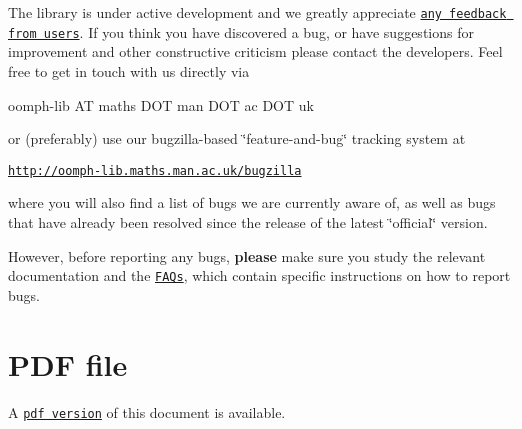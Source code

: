 The library is under active development and we greatly appreciate \href{../../contact/html/index.html}{\tt any feedback from users}. If you think you have discovered a bug, or have suggestions for improvement and other constructive criticism please contact the developers. Feel free to get in touch with us directly via

\begin{center} {\ttfamily  oomph-\/lib AT maths D\+OT man D\+OT ac D\+OT uk } \end{center} 

or (preferably) use our bugzilla-\/based \char`\"{}feature-\/and-\/bug\char`\"{} tracking system at

\begin{center} \href{http://oomph-lib.maths.man.ac.uk/bugzilla}{\tt http\+://oomph-\/lib.\+maths.\+man.\+ac.\+uk/bugzilla} \end{center} 

where you will also find a list of bugs we are currently aware of, as well as bugs that have already been resolved since the release of the latest \char`\"{}official\char`\"{} version.

However, before reporting any bugs, {\bfseries please} make sure you study the relevant documentation and the \href{../../FAQ/html/index.html}{\tt F\+A\+Qs}, which contain specific instructions on how to report bugs.



 

 \hypertarget{index_pdf}{}\section{P\+D\+F file}\label{index_pdf}
A \href{../latex/refman.pdf}{\tt pdf version} of this document is available. 
